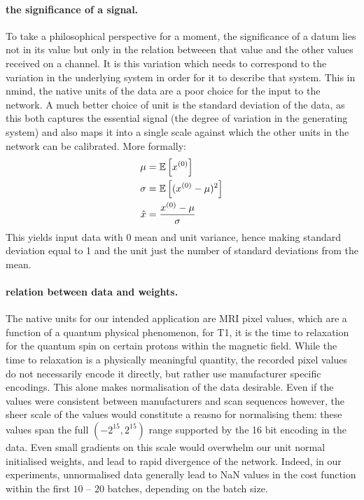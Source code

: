\documentclass[msc]{infthesis}
\newcommand{\activation}[2][]{x_{#1}^{(#2)}}
\begin{document}
\paragraph*{the significance of a signal.}
%
To take a philosophical perspective for a moment, the significance of a datum lies not in its value
but only in the relation betweeen that value and the other values received on a channel.  It is this
variation which needs to correspond to the variation in the underlying system in order for it to
describe that system.  This in nmind, the native units of the data are a poor choice  for the input
to the network.  A much better choice of unit is the standard deviation of the data, as this
both captures the essential signal (the degree of variation in the generating system) and also
maps it into a single scale against which the other units in the network can be calibrated.
%
More formally:
%
\begin{align}
  \label{eq:data-normalisation}
  \mu &= \expect{\activation{0}} \\
  \sigma &= \expect{{ (\activation{0} - \mu)^2 }} \\
  \hat{x} &= { \activation{0} - \mu \over \sigma }
\end{align}
This yields input data with 0 mean and unit variance, hence making standard deviation equal to 1 and
the unit just the number of standard deviations from the mean.


\paragraph*{relation between data and weights.}
%
The native units for our intended application are MRI pixel values, which are a function of a
quantum physical phenomenon, for T1, it is the time to relaxation for the quantum spin on
certain protons within the magnetic field.  While the time to relaxation is a physically
meaningful quantity, the recorded pixel values do not necessarily encode it directly, but rather
use manufacturer specific encodings.  This alone makes normalisation of the data desirable.  Even
if the values were consistent between manufacturers and scan sequences however, the sheer scale
of the values would constitute a reasno for normalising them: these values span the full \((-2^{15},
2^{15})\)
range supported by the 16 bit encoding in the data.  Even small gradients on this scale
would overwhelm our unit normal initialised weights, and lead to rapid divergence of the network.
Indeed, in our experiments, unnormalised data generally lead to NaN values in the cost function
within the first \(10\) -- \(20\) batches, depending on the batch size.
\end{document}
